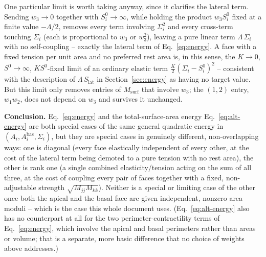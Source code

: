 \documentclass[11pt,a4paper]{report}
\begin{document}
One particular limit is worth taking anyway, since it clarifies the
lateral term. Sending $w_3\to0$ together with $S_i^0\to\infty$, while
holding the product $w_3S_i^0$ fixed at a finite value $-\Lambda/2$,
removes every term involving $\Sigma_i^2$ and every cross-term
touching $\Sigma_i$ (each is proportional to $w_3$ or $w_3^2$),
leaving a pure linear term $\Lambda\,\Sigma_i$ with no self-coupling
-- exactly the lateral term of Eq.~\eqref{eq:energy}. A face with a
fixed tension per unit area and no preferred rest area is, in this
sense, the $K\to0$, $S^0\to\infty$, $KS^0$-fixed limit of an ordinary
elastic term $\tfrac{K}{2}(\Sigma_i-S_i^0)^2$ -- consistent with the
description of $\Lambda\,S_{\mathrm{lat}}$ in Section~\ref{sec:energy}
as having no target value. But this limit only removes entries of
$M_{\mathrm{surf}}$ that involve $w_3$; the $(1,2)$ entry, $w_1w_2$,
does not depend on $w_3$ and survives it unchanged.

\begin{physbox}
\textbf{Conclusion.} Eq.~\eqref{eq:energy} and the total-surface-area
energy Eq.~\eqref{eq:alt-energy} are both special cases of the same
general quadratic energy in $(A_i, A_i^{\mathrm{bas}}, \Sigma_i)$, but
they are special cases in genuinely different, non-overlapping ways:
one is diagonal (every face elastically independent of every other,
at the cost of the lateral term being demoted to a pure tension with
no rest area), the other is rank one (a single combined
elasticity/tension acting on the sum of all three, at the cost of
coupling every pair of faces together with a fixed, non-adjustable
strength $\sqrt{M_{jj}M_{kk}}$). Neither is a special or limiting case
of the other once both the apical and the basal face are given
independent, nonzero area moduli -- which is the case this whole
document uses. (Eq.~\eqref{eq:alt-energy} also has no counterpart at
all for the two perimeter-contractility terms of Eq.~\eqref{eq:energy},
which involve the apical and basal perimeters rather than areas or
volume; that is a separate, more basic difference that no choice of
weights above addresses.)
\end{physbox}
\end{document}
